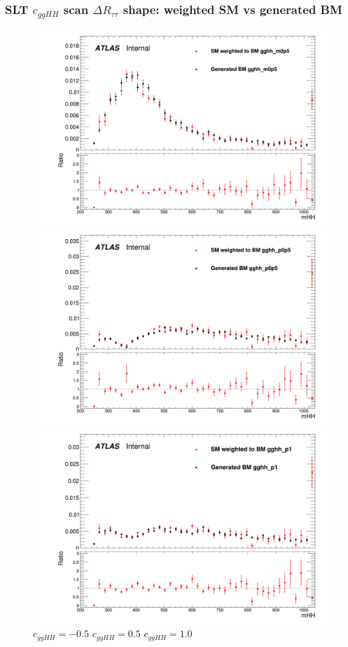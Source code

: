 \documentclass[twoside,11pt]{beamer}
\begin{document}
\begin{frame}
    \frametitle{SLT $c_{ggHH}$ scan $\Delta R_{\tau\tau}$ shape: weighted SM vs generated BM}

    \begin{figure}
    \includegraphics[width=.32\textwidth]{figures/Method_B_all_latest/BMgghh_m0p5h_mHH.png}
    \includegraphics[width=.32\textwidth]{figures/Method_B_all_latest/BMgghh_p0p5h_mHH.png}
    \includegraphics[width=.32\textwidth]{figures/Method_B_all_latest/BMgghh_p1h_mHH.png}
    $c_{ggHH} = -0.5$ \hspace{5em} $c_{ggHH} = 0.5$\hspace{5em} $c_{ggHH} = 1.0$
    \end{figure}


\end{frame}     
\end{document}
